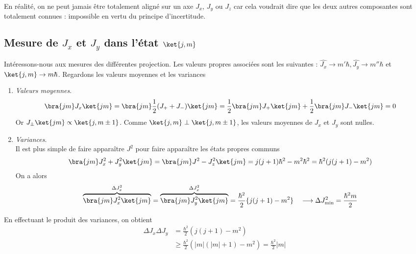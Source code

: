 	En réalité, on ne peut jamais être totalement aligné sur un axe $J_x$, $J_y$ ou $J_z$ car cela 
	voudrait dire que les deux autres composantes sont totalement connues : impossible en vertu du 
	principe d'incertitude.



	\subsection{Mesure de $J_x$ et $J_y$ dans l'état $\ket{j,m}$}
	Intéressons-nous aux mesures des différentes projection. Les valeurs propres associées sont 
	les suivantes : $\hat{J_x}\rightarrow m'\hbar, \hat{J_y}\rightarrow m''\hbar$ et 
	$\ket{j,m}\rightarrow m\hbar$. Regardons les valeurs moyennes et les variances
	\begin{enumerate}
	\item \textit{Valeurs moyennes}.
	\begin{equation}
	\bra{jm}J_x\ket{jm} = \bra{jm}\frac{1}{2}(J_++J_-)\ket{jm} = \frac{1}{2}\bra{jm}J_+\ket{jm}+
	\frac{1}{2}\bra{jm}J_-\ket{jm} =0
	\end{equation}
	Or $J_\pm\ket{jm}\propto \ket{j,m\pm 1}$. Comme $\ket{j,m}\perp\ket{j,m\pm1}$, les valeurs 
	moyennes de $J_x$ et $J_y$ sont nulles.
	\item \textit{Variances}.\\
	Il est plus simple de faire apparaître $J^2$ pour faire apparaître les états propres communs
	\begin{equation}
	\bra{jm} J_x^2+J_y^2 \ket{jm}= \bra{jm}J^2-J_z^2 \ket{jm} = j(j+1)\hbar^2-m^2\hbar^2 = \hbar^2(j(j+1)
	-m^2)
	\end{equation}
	On a alors
	\begin{equation}
	\overbrace{\bra{jm}J_x^2\ket{jm}}^{\Delta J_x^2} = \overbrace{\bra{jm}J_y^2\ket{jm}}^{\Delta J_x^2} 
	= \frac{\hbar^2}{2}\{j(j+1)-m^2\}\quad \longrightarrow \Delta J^2_{\min} = \frac{\hbar^2m}{2}
	\end{equation}	
	\end{enumerate}
	En effectuant le produit des variances, on obtient %
	\begin{equation}
	\begin{array}{ll}
	\Delta J_x\Delta J_y &= \frac{\hbar^2}{2}(j(j+1)-m^2)\\
	&\geq \frac{\hbar^2}{2}(|m|(|m|+1)-m^2) = \frac{\hbar^2}{2}|m|
	\end{array}
	\end{equation}
	
